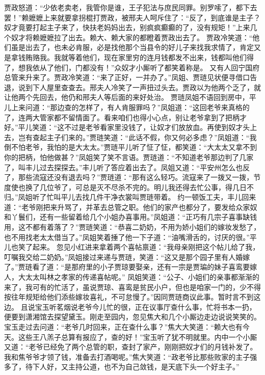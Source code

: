 \documentclass[12pt,oneside]{book}
\begin{document}
贾政怒道：“少依老卖老，我管你是谁，王子犯法与庶民同罪。别罗嗦了，都下去罢！”赖嬷嬷上来就要拿拐棍打贾政，被邢夫人呵斥住了：“反了，到底谁是主子？奴才竟要打起主子来了，快扶老妈妈出去，别疯疯癫癫的了，没有规矩！”上来几个奴才将赖嬷嬷拉了出去。赖大、赖大家的都瞪着贾政出去了。
贾政冷笑道：“他们虽是出去了，也未必肯服，必是找他那个当县令的好儿子来找我求情了，肯定又是拿钱贿赂我。我就等着他们，现在家里穷的连月钱都发不出来，钱都叫他们得了，想我依从了他们，门都没有！”众奴才小厮听了都笑着称是。
又有人回宁国府总管来升来了。贾政冷笑道：“来了正好，一并办了。”凤姐、贾琏见状便寻借口告退，说到下人屋里查查去。邢夫人冷笑了一声扭过头去。贾政以为他两个乏了，就让他两个先回去，他仍和邢夫人等后面的来好处治。
贾琏凤姐不语回到房中，平儿上来问道：“那边查的怎样了，有人肯服罪吗？”凤姐道：“这回老爷来真格的了，连两大管家都不留情面了。看来咱们也得小心点，别让老爷拿到了把柄才好。”平儿笑道：“这不过是老爷看家里没钱了，让奴才们放放血。再使到奴才头上去，岂有查起主子们来的。”贾琏笑道：“此话不假，你又何必多虑？”凤姐道：“我倒不怕老爷，我怕的是大太太。”贾琏平儿听了怔了怔，都笑道：“大太太又拿不到你的把柄，怕他做甚？”凤姐笑了笑不言语。贾琏道：“不知道老爷那边判了几家了，叫丰儿过去探探去。”丰儿听了答应着出去了。凤姐又道：“平安州怎么也反了，那些流寇还没有退去吗？”贾琏道：“那有这么轻巧。流寇来了一拨又一拨，节度使也换了几位爷了，可总是灭不尽杀不完的。明儿我还得去忙公事，得几日不归。”凤姐听了忙叫平儿去找几件干净衣裳叫贾琏带着。
约一顿饭工夫，丰儿回来道：“老爷刚把来升骂了，并革去总管之职。他们的家产也都分了，要发给众家奴和丫鬟们，还有一些留着给几个小姐办喜事用。”凤姐道：“正巧有几宗子喜事缺钱用，这不都有着落了？”贾琏笑道：“恭喜二奶奶，不用为娇小姐们的嫁妆发愁了，也不用找老太太借当了。”凤姐笑着捶了他一下子道：“油嘴滑舌的，讨厌的很。”平儿也笑了起来。
忽见小红进来拿着两个喜帖禀道：“我母亲刚把这个帖儿给了我，叮嘱我交给二奶奶。”凤姐接过来递与贾琏，笑道：“这又是那个园子里有人婚嫁了。”贾琏看了道：“是那府里的小子贾琼要娶亲，还有一宗是贾㻞的妹子喜鸾要嫁人，大太太叫林之孝家的传递喜帖呢。”
凤姐笑道：“公子、小姐们的亲事都渐渐的来了，我可有的忙活了，虽说贾琼、喜鸾是贫民小户，但也是咱家一门的，少不得按往年规矩给他们添些嫁妆喜礼，不可怠慢了。”因同贾琏商议此事。暂时言不到这边。
且说宝玉听茗烟说老爷今儿忙的很，正在议事厅查什么事，忙将书本一扔，便要到潇湘馆去探望黛玉。刚走至园内，忽见焦大和几个小厮边走边说说笑笑的。宝玉走过去问道：“老爷几时回来，正在查什么事？”焦大大笑道：“赖大也有今天。这些王八羔子总算有报应了，查的好！”宝玉听了犹不明就里。内中一个小厮又道：“老爷已经免了两个总管的职，查封了家产，刚刚把奴才们的月钱补发了。我和焦爷爷才领了钱，准备去打酒喝呢。”焦大笑道：“政老爷比那些败家的主子强多了，待下人好，又主持公道，也不为自己敛钱，是天底下头一个好主子。”
\end{document}
